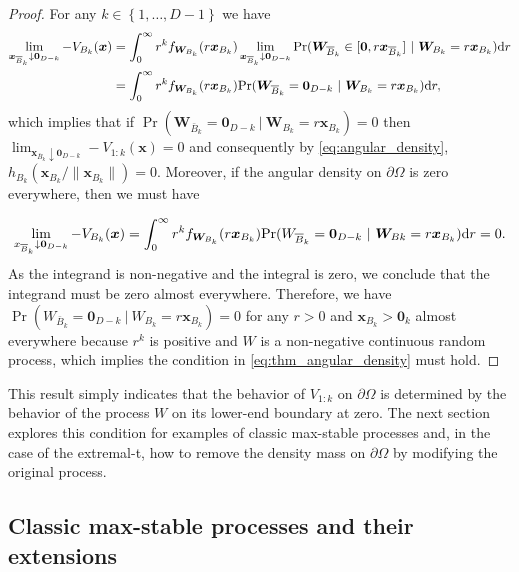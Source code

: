 \documentclass[lineno]{biometrika}
\begin{document}
\begin{proof}
For any $k \in \left\{1, \ldots, D-1 \right\}$ we have
\begin{align*}
\lim_{\bm x_{{\overline{B}}_k} \downarrow \bm 0_{D-k} } -V_{B_k}(\bm x) &= \int_0^\infty r^k f_{\bm W_{B_k}}(r \bm x_{B_k}) \lim_{\bm x_{{\overline{B}}_k} \downarrow \bm 0_{D-k} }{\rm Pr}(\bm W_{{\overline{B}}_k} \in [\bm 0,r \bm x_{{\overline{B}}_k} ]\ |\ \bm W_{B_k} = r \bm x_{B_k} )\text dr\\
&= \int_0^\infty r^k f_{\bm W_{B_k}}(r \bm x_{B_k}){\rm Pr}(\bm W_{{\overline{B}}_k}=\bm 0_{D-k}\ |\ \bm W_{B_k}=r \bm x_{B_k} )\text dr,
\end{align*}
which implies that if $\Pr(\bm W_{\bar{B}_k}=\bm 0_{D-k}\ |\ \bm W_{B_k}=r \bm x_{B_k} )=0$ then $\lim_{\bm x_{\bar{B}_k} \downarrow \bm 0_{D-k} } -V_{1:k}(\bm x) = 0$ and consequently by \eqref{eq:angular_density}, $h_{B_k}\left(\bm x_{B_k} / \|\bm x_{B_k}\| \right)=0$.
%
Moreover, if the angular density on $\partial\Omega$ is zero everywhere, then we must have 

$$\lim_{x_{{\overline{B}}_k}\downarrow \bm 0_{D-k} } -V_{B_k}(\bm x) = \int_0^\infty r^k f_{\bm W_{B_k}}(r \bm x_{B_k}){\rm Pr}(W_{{\overline{B}}_k} = \bm 0_{D-k}\ |\ \bm W_{Bk}=r \bm x_{B_k} )\text dr = 0.$$
As the integrand is non-negative and the integral is zero, we conclude that the integrand must be zero almost everywhere. Therefore, we have $\Pr(W_{\bar{B}_k} = \bm 0_{D-k}\ |\ W_{B_k}=r\bm x_{B_k} )=0$ for any $r>0$ and $\bm x_{B_k} > \bm 0_k$ almost everywhere because $r^k$ is positive and $W$ is a non-negative continuous random process, which implies the condition in \eqref{eq:thm_angular_density} must hold.
\end{proof}	
This result simply indicates that the behavior of $V_{1:k}$ on $\partial\Omega$ is determined by the behavior of the process $W$ on its lower-end boundary at zero. The next section 
explores this condition for
examples of classic max-stable processes and, in the case of the extremal-t, how to remove the density mass on $\partial\Omega$ by modifying the original process.   

\subsection{Classic max-stable processes and their extensions}
\end{document}
